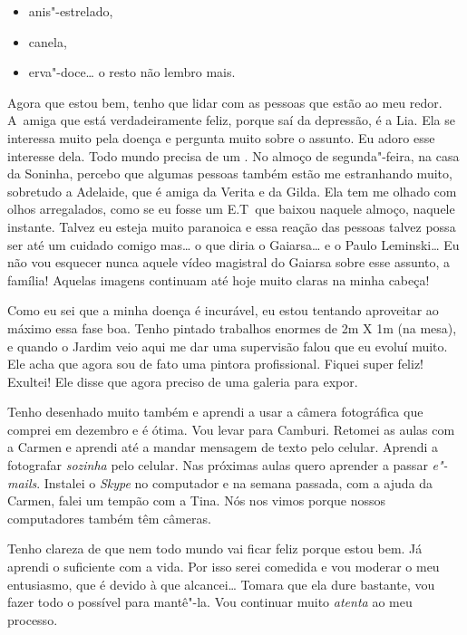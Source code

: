 \begin{itemize}
\item
  anis"-estrelado,
\item
  canela,
\item
  erva"-doce… o resto não lembro mais.
\end{itemize}

Agora que estou bem, tenho que lidar com as pessoas que estão ao meu
redor. A~amiga que está verdadeiramente feliz, porque saí da depressão,
é a Lia. Ela se interessa muito pela doença e pergunta muito sobre o
assunto. Eu adoro esse interesse dela. Todo mundo precisa de um 
. No almoço de segunda"-feira, na casa da Soninha, percebo que
algumas pessoas também estão me estranhando muito, sobretudo a Adelaide,
que é amiga da Verita e da Gilda. Ela tem me olhado com olhos
arregalados, como se eu fosse um E.T\, que baixou naquele almoço, naquele
instante. Talvez eu esteja muito paranoica e essa reação das pessoas
talvez possa ser até um cuidado comigo mas… o que diria o
Gaiarsa… e o Paulo Leminski… Eu não vou esquecer nunca
aquele vídeo magistral do Gaiarsa sobre esse assunto, a família! Aquelas
imagens continuam até hoje muito claras na minha cabeça!

Como eu sei que a minha doença é incurável, eu estou tentando aproveitar
ao máximo essa fase boa. Tenho pintado trabalhos enormes de 2m X 1m (na
mesa), e quando o Jardim veio aqui me dar uma supervisão falou que eu
evoluí muito. Ele acha que agora sou de fato uma pintora profissional.
Fiquei super feliz! Exultei! Ele disse que agora preciso de uma
galeria para expor.

Tenho desenhado muito também e aprendi a usar a câmera fotográfica que
comprei em dezembro e é ótima. Vou levar para Camburi. Retomei as aulas
com a Carmen e aprendi até a mandar mensagem de texto pelo celular.
Aprendi a fotografar \emph{sozinha} pelo celular. Nas próximas aulas
quero aprender a passar \emph{e"-mails}. Instalei o \emph{Skype} no
computador e na semana passada, com a ajuda da Carmen, falei um tempão
com a Tina. Nós nos vimos porque nossos computadores também têm câmeras.

Tenho clareza de que nem todo mundo vai ficar feliz porque estou bem. Já
aprendi o suficiente com a vida. Por isso serei comedida e vou moderar o
meu entusiasmo, que é devido à  que alcancei… Tomara
que ela dure bastante, vou fazer todo o possível para mantê"-la. Vou
continuar muito \emph{atenta} ao meu processo.

